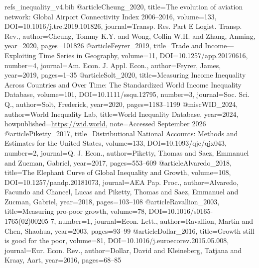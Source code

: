 \begin{filecontents*}[overwrite]{refs_inequality_v4.bib}
@article{Cheung_2020, title={The evolution of aviation network: {Global Airport Connectivity Index} 2006--2016}, volume={133}, DOI={10.1016/j.tre.2019.101826}, journal={Transp. Res. Part E Logist. Transp. Rev.}, author={Cheung, Tommy K.Y. and Wong, Collin W.H. and Zhang, Anming}, year={2020}, pages={101826} }
@article{Feyrer_2019, title={Trade and Income---{Exploiting} Time Series in Geography}, volume={11}, DOI={10.1257/app.20170616}, number={4}, journal={Am. Econ. J. Appl. Econ.}, author={Feyrer, James}, year={2019}, pages={1--35} }
@article{Solt_2020, title={Measuring Income Inequality Across Countries and Over Time: The {Standardized World Income Inequality Database}}, volume={101}, DOI={10.1111/ssqu.12795}, number={3}, journal={Soc. Sci. Q.}, author={Solt, Frederick}, year={2020}, pages={1183--1199} }
@misc{WID_2024, author={{World Inequality Lab}}, title={World Inequality Database}, year={2024}, howpublished={\url{https://wid.world}}, note={Accessed September 2026} }
@article{Piketty_2017, title={Distributional National Accounts: Methods and Estimates for the {United States}}, volume={133}, DOI={10.1093/qje/qjx043}, number={2}, journal={Q. J. Econ.}, author={Piketty, Thomas and Saez, Emmanuel and Zucman, Gabriel}, year={2017}, pages={553--609} }
@article{Alvaredo_2018, title={The Elephant Curve of Global Inequality and Growth}, volume={108}, DOI={10.1257/pandp.20181073}, journal={AEA Pap. Proc.}, author={Alvaredo, Facundo and Chancel, Lucas and Piketty, Thomas and Saez, Emmanuel and Zucman, Gabriel}, year={2018}, pages={103--108} }
@article{Ravallion_2003, title={Measuring pro-poor growth}, volume={78}, DOI={10.1016/s0165-1765(02)00205-7}, number={1}, journal={Econ. Lett.}, author={Ravallion, Martin and Chen, Shaohua}, year={2003}, pages={93--99} }
@article{Dollar_2016, title={Growth still is good for the poor}, volume={81}, DOI={10.1016/j.euroecorev.2015.05.008}, journal={Eur. Econ. Rev.}, author={Dollar, David and Kleineberg, Tatjana and Kraay, Aart}, year={2016}, pages={68--85} }

\end{filecontents*}
